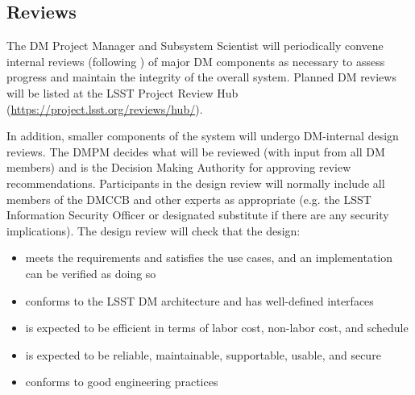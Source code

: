 \subsection{Reviews} \label{sect:reviews}

The DM Project Manager and Subsystem Scientist will periodically convene internal reviews (following )
of major DM components as necessary to assess progress and maintain the integrity of the overall system. Planned DM reviews will be listed at the LSST Project Review Hub (\url{https://project.lsst.org/reviews/hub/}).


In addition, smaller components of the system will undergo DM-internal design reviews.  The DMPM decides what will be reviewed (with input from all DM members) and is the Decision Making Authority for approving review recommendations.  Participants in the design review will normally include all members of the DMCCB and other experts as appropriate (e.g. the LSST Information Security Officer or designated substitute if there are any security implications).  The design review will check that the design:
\begin{itemize}
\item meets the requirements and satisfies the use cases, and an implementation can be verified as doing so
\item conforms to the LSST DM architecture and has well-defined interfaces
\item is expected to be efficient in terms of labor cost, non-labor cost, and schedule
\item is expected to be reliable, maintainable, supportable, usable, and secure
\item conforms to good engineering practices
\end{itemize}

